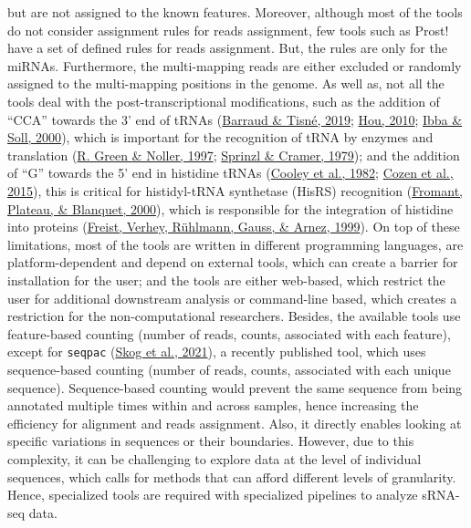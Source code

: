 \documentclass[12pt,twoside]{reedthesis}
\begin{document}
but are not assigned to the known features. Moreover, although most of
the tools do not consider assignment rules for reads assignment, few
tools such as Prost! have a set of defined rules for reads assignment.
But, the rules are only for the miRNAs. Furthermore, the multi-mapping
reads are either excluded or randomly assigned to the multi-mapping
positions in the genome. As well as, not all the tools deal with the
post-transcriptional modifications, such as the addition of ``CCA''
towards the 3' end of tRNAs (\protect\hyperlink{ref-barraud2019}{Barraud \& Tisné, 2019}; \protect\hyperlink{ref-hou2010}{Hou, 2010}; \protect\hyperlink{ref-ibba2000}{Ibba \& Soll, 2000}), which
is important for the recognition of tRNA by enzymes and translation
(\protect\hyperlink{ref-green1997}{R. Green \& Noller, 1997}; \protect\hyperlink{ref-sprinzl1979}{Sprinzl \& Cramer, 1979}); and the addition of ``G'' towards the 5' end
in histidine tRNAs (\protect\hyperlink{ref-cooley1982}{Cooley et al., 1982}; \protect\hyperlink{ref-cozen2015}{Cozen et al., 2015}), this is critical for
histidyl-tRNA synthetase (HisRS) recognition (\protect\hyperlink{ref-fromant2000}{Fromant, Plateau, \& Blanquet, 2000}), which is
responsible for the integration of histidine into proteins
(\protect\hyperlink{ref-freist1999}{Freist, Verhey, Rühlmann, Gauss, \& Arnez, 1999}). On top of these limitations, most of the tools are
written in different programming languages, are platform-dependent and
depend on external tools, which can create a barrier for installation
for the user; and the tools are either web-based, which restrict the
user for additional downstream analysis or command-line based, which
creates a restriction for the non-computational researchers. Besides,
the available tools use feature-based counting (number of reads, counts,
associated with each feature), except for \texttt{seqpac} (\protect\hyperlink{ref-skog2021}{Skog et al., 2021}), a recently
published tool, which uses sequence-based counting (number of reads,
counts, associated with each unique sequence). Sequence-based counting
would prevent the same sequence from being annotated multiple times
within and across samples, hence increasing the efficiency for alignment
and reads assignment. Also, it directly enables looking at specific
variations in sequences or their boundaries. However, due to this
complexity, it can be challenging to explore data at the level of
individual sequences, which calls for methods that can afford different
levels of granularity. Hence, specialized tools are required with
specialized pipelines to analyze sRNA-seq data.
\end{document}
